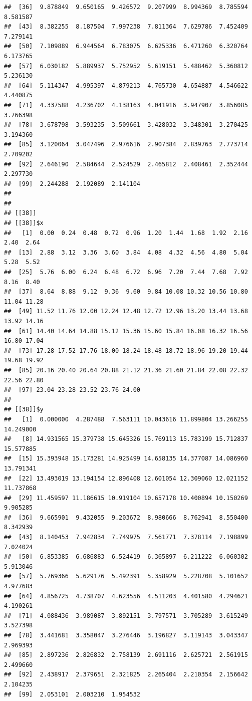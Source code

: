 \documentclass[
  ignorenonframetext,
]{beamer}
\begin{document}
\begin{frame}[fragile]{}
\begin{verbatim}
##  [36]  9.878849  9.650165  9.426572  9.207999  8.994369  8.785594  8.581587
##  [43]  8.382255  8.187504  7.997238  7.811364  7.629786  7.452409  7.279141
##  [50]  7.109889  6.944564  6.783075  6.625336  6.471260  6.320764  6.173765
##  [57]  6.030182  5.889937  5.752952  5.619151  5.488462  5.360812  5.236130
##  [64]  5.114347  4.995397  4.879213  4.765730  4.654887  4.546622  4.440875
##  [71]  4.337588  4.236702  4.138163  4.041916  3.947907  3.856085  3.766398
##  [78]  3.678798  3.593235  3.509661  3.428032  3.348301  3.270425  3.194360
##  [85]  3.120064  3.047496  2.976616  2.907384  2.839763  2.773714  2.709202
##  [92]  2.646190  2.584644  2.524529  2.465812  2.408461  2.352444  2.297730
##  [99]  2.244288  2.192089  2.141104
## 
## 
## [[38]]
## [[38]]$x
##   [1]  0.00  0.24  0.48  0.72  0.96  1.20  1.44  1.68  1.92  2.16  2.40  2.64
##  [13]  2.88  3.12  3.36  3.60  3.84  4.08  4.32  4.56  4.80  5.04  5.28  5.52
##  [25]  5.76  6.00  6.24  6.48  6.72  6.96  7.20  7.44  7.68  7.92  8.16  8.40
##  [37]  8.64  8.88  9.12  9.36  9.60  9.84 10.08 10.32 10.56 10.80 11.04 11.28
##  [49] 11.52 11.76 12.00 12.24 12.48 12.72 12.96 13.20 13.44 13.68 13.92 14.16
##  [61] 14.40 14.64 14.88 15.12 15.36 15.60 15.84 16.08 16.32 16.56 16.80 17.04
##  [73] 17.28 17.52 17.76 18.00 18.24 18.48 18.72 18.96 19.20 19.44 19.68 19.92
##  [85] 20.16 20.40 20.64 20.88 21.12 21.36 21.60 21.84 22.08 22.32 22.56 22.80
##  [97] 23.04 23.28 23.52 23.76 24.00
## 
## [[38]]$y
##   [1]  0.000000  4.287488  7.563111 10.043616 11.899804 13.266255 14.249000
##   [8] 14.931565 15.379738 15.645326 15.769113 15.783199 15.712837 15.577885
##  [15] 15.393948 15.173281 14.925499 14.658135 14.377087 14.086960 13.791341
##  [22] 13.493019 13.194154 12.896408 12.601054 12.309060 12.021152 11.737868
##  [29] 11.459597 11.186615 10.919104 10.657178 10.400894 10.150269  9.905285
##  [36]  9.665901  9.432055  9.203672  8.980666  8.762941  8.550400  8.342939
##  [43]  8.140453  7.942834  7.749975  7.561771  7.378114  7.198899  7.024024
##  [50]  6.853385  6.686883  6.524419  6.365897  6.211222  6.060302  5.913046
##  [57]  5.769366  5.629176  5.492391  5.358929  5.228708  5.101652  4.977683
##  [64]  4.856725  4.738707  4.623556  4.511203  4.401580  4.294621  4.190261
##  [71]  4.088436  3.989087  3.892151  3.797571  3.705289  3.615249  3.527398
##  [78]  3.441681  3.358047  3.276446  3.196827  3.119143  3.043347  2.969393
##  [85]  2.897236  2.826832  2.758139  2.691116  2.625721  2.561915  2.499660
##  [92]  2.438917  2.379651  2.321825  2.265404  2.210354  2.156642  2.104235
##  [99]  2.053101  2.003210  1.954532

\end{verbatim}
\end{frame}
\end{document}
